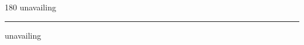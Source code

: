 
\begin{frame}
\begin{center}
\begin{turn}{180}
{\fontsize{2.5cm}{1em}\selectfont unavailing}
\end{turn}
\vspace{1em}\par  
\hrule
\vspace{1em}\par  
{\fontsize{2.5cm}{1em}\selectfont unavailing}
\end{center}
\end{frame}

